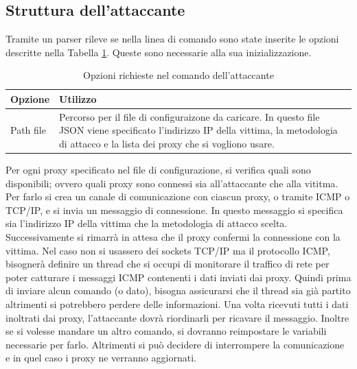 \subsection{Struttura dell'attaccante}  
Tramite un parser rileve se nella linea di comando sono state inserite le opzioni 
descritte nella Tabella \ref{table:comunicazione:attacccante:opzioni}.
Queste sono necessarie alla sua inizializzazione. 
\begin{longtable}{|p{}|p{}|} 
\caption{Opzioni richieste nel comando dell'attaccante} 
\label{table:comunicazione:attacccante:opzioni} \\
    \hline 
    \textbf{Opzione} & \textbf{Utilizzo}  \\
    \hline
    Path file & 
    Percorso per il file di configuraizone da caricare. In questo file JSON viene specificato 
    l'indirizzo IP della vittima, la metodologia di attacco e la lista dei proxy che si vogliono usare. 
    \\ 
    \hline  
\end{longtable} 
\vspace{2ex} 
Per ogni proxy specificato nel file di configurazione, si verifica quali sono disponibili; 
ovvero quali proxy sono connessi sia all'attaccante che alla vititma.  
Per farlo si crea un canale di comunicazione con ciascun proxy, o tramite ICMP o TCP/IP, 
e si invia un messaggio di connessione. 
In questo messaggio si specifica sia l'indirizzo IP della vittima che la metodologia di attacco scelta.
Successivamente si rimarrà in attesa che il proxy confermi la connessione con la vittima.  
\vspace{2ex} \newline 
Nel caso non si usassero dei sockets TCP/IP ma il protocollo ICMP, bisognerà definire un thread 
che si occupi di monitorare il traffico di rete per poter catturare i messaggi ICMP contenenti i dati 
inviati dai proxy. 
Quindi prima di inviare alcun comando (o dato), bisogna assicurarsi che il thread sia già partito altrimenti si 
potrebbero perdere delle informazioni. 
\vspace{1ex} \newline
Una volta ricevuti tutti i dati inoltrati dai proxy, l'attaccante dovrà riordinarli per ricavare il messaggio. 
Inoltre se si volesse mandare un altro comando, si dovranno reimpostare le variabili necessarie per farlo.
Altrimenti si può decidere di interrompere la comunicazione e in quel caso i proxy ne verranno aggiornati. 



